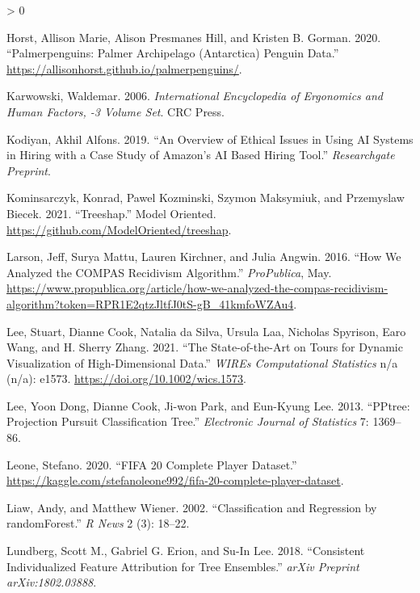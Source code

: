\documentclass[
]{article}
\newlength{\cslhangindent}
\newenvironment{CSLReferences}[2] %
 {%
  \setlength{\parindent}{0pt}
  \ifodd #1 \everypar{\setlength{\hangindent}{\cslhangindent}}\ignorespaces\fi
  \ifnum #2 > 0
  \setlength{\parskip}{#2\baselineskip}
  \fi
 }%
 {}
\begin{document}
\begin{CSLReferences}{1}{0}
\leavevmode\hypertarget{ref-horst_palmerpenguins_2020}{}%
Horst, Allison Marie, Alison Presmanes Hill, and Kristen B. Gorman. 2020. {``Palmerpenguins: {Palmer} {Archipelago} ({Antarctica}) Penguin Data.''} \url{https://allisonhorst.github.io/palmerpenguins/}.

\leavevmode\hypertarget{ref-karwowski_international_2006}{}%
Karwowski, Waldemar. 2006. \emph{International {Encyclopedia} of {Ergonomics} and {Human} {Factors}, -3 {Volume} {Set}}. CRC Press.

\leavevmode\hypertarget{ref-kodiyan_overview_2019}{}%
Kodiyan, Akhil Alfons. 2019. {``An Overview of Ethical Issues in Using {AI} Systems in Hiring with a Case Study of {Amazon}'s {AI} Based Hiring Tool.''} \emph{Researchgate Preprint}.

\leavevmode\hypertarget{ref-kominsarczyk_treeshap_2021}{}%
Kominsarczyk, Konrad, Pawel Kozminski, Szymon Maksymiuk, and Przemyslaw Biecek. 2021. {``Treeshap.''} Model Oriented. \url{https://github.com/ModelOriented/treeshap}.

\leavevmode\hypertarget{ref-larson_how_2016}{}%
Larson, Jeff, Surya Mattu, Lauren Kirchner, and Julia Angwin. 2016. {``How {We} {Analyzed} the {COMPAS} {Recidivism} {Algorithm}.''} \emph{ProPublica}, May. \url{https://www.propublica.org/article/how-we-analyzed-the-compas-recidivism-algorithm?token=RPR1E2qtzJltfJ0tS-gB_41kmfoWZAu4}.

\leavevmode\hypertarget{ref-lee_state_2021}{}%
Lee, Stuart, Dianne Cook, Natalia da Silva, Ursula Laa, Nicholas Spyrison, Earo Wang, and H. Sherry Zhang. 2021. {``The State-of-the-Art on Tours for Dynamic Visualization of High-Dimensional Data.''} \emph{WIREs Computational Statistics} n/a (n/a): e1573. \url{https://doi.org/10.1002/wics.1573}.

\leavevmode\hypertarget{ref-lee_pptree_2013}{}%
Lee, Yoon Dong, Dianne Cook, Ji-won Park, and Eun-Kyung Lee. 2013. {``{PPtree}: {Projection} Pursuit Classification Tree.''} \emph{Electronic Journal of Statistics} 7: 1369--86.

\leavevmode\hypertarget{ref-leone_fifa_2020}{}%
Leone, Stefano. 2020. {``{FIFA} 20 Complete Player Dataset.''} \url{https://kaggle.com/stefanoleone992/fifa-20-complete-player-dataset}.

\leavevmode\hypertarget{ref-liaw_classification_2002}{}%
Liaw, Andy, and Matthew Wiener. 2002. {``Classification and Regression by {randomForest}.''} \emph{R News} 2 (3): 18--22.

\leavevmode\hypertarget{ref-lundberg_consistent_2018}{}%
Lundberg, Scott M., Gabriel G. Erion, and Su-In Lee. 2018. {``Consistent Individualized Feature Attribution for Tree Ensembles.''} \emph{arXiv Preprint arXiv:1802.03888}.


\end{CSLReferences}
\end{document}
